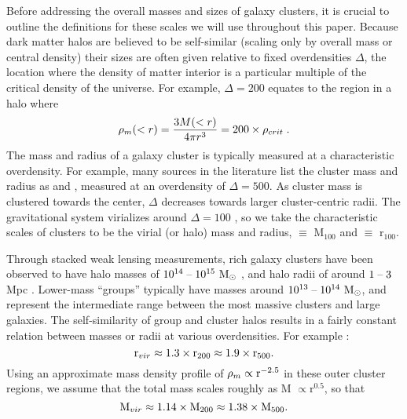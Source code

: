 Before addressing the overall masses and sizes of galaxy clusters, it
is crucial to outline the definitions for these scales we will use
throughout this paper. Because dark matter halos are believed to be
self-similar (scaling only by overall mass or central density) their
sizes are often given relative to fixed overdensities $\Delta$, the
location where the density of matter interior is a particular multiple of
the critical density of the universe. For example, $\Delta = 200$
equates to the region in a halo where
\begin{equation}
\rho_m(<r) = \frac{3M(<r)}{4\pi{}r^3} = 200\times\rho_{crit}\;. \nonumber
\end{equation}
The mass and radius of a galaxy cluster is typically measured at a
characteristic overdensity. For example, many sources in the
literature list the cluster mass and radius as \Mfive{} and
\rfive{}, measured at an overdensity of $\Delta = 500$. As cluster
mass is clustered towards the center, $\Delta$ decreases towards
larger cluster-centric radii. The gravitational system virializes
around $\Delta = 100$ \citep{Eke1996}, so we take the characteristic
scales of clusters to be the virial (or halo) mass and radius,
\Mvir{} $ \equiv $ M$_{100}$ and \rvir{} $ \equiv $ r$_{100}$.

Through stacked weak lensing measurements, rich galaxy clusters have
been observed to have halo masses of $10^{14}\;\textrm{--}\;10^{15}~\textrm{M}_\odot{}$
\citep{Mandelbaum2008}, and halo radii of around $1\;\textrm{--}\;3$ Mpc
\citep{Vikhlinin2006}. Lower-mass ``groups'' typically have masses
around $10^{13} \;\textrm{--}\; 10^{14}~\textrm{M}_\odot{}$, and represent the intermediate
range between the most massive clusters and large galaxies. The
self-similarity of group and cluster halos results in a fairly
constant relation between masses or radii at various overdensities. For
example \citep{Rasheed2011}:
\begin{equation}
\textrm{r\ensuremath{_{vir}}}{} \approx 1.3\times{}\textrm{r\ensuremath{_{200}}}{} \approx
1.9\times{}\textrm{r\ensuremath{_{500}}}{}.
\end{equation}
Using an approximate mass density profile of $\rho_m \propto
\textrm{r}^{-2.5}$ in these outer cluster regions, we assume that the
total mass scales roughly as M $\propto \textrm{r}^{0.5}$, so that
\begin{equation}
\textrm{M\ensuremath{_{vir}}}{} \approx 1.14\times{}\textrm{M\ensuremath{_{200}}}{} \approx 1.38 \times{}\textrm{M\ensuremath{_{500}}}{}.
\end{equation}


